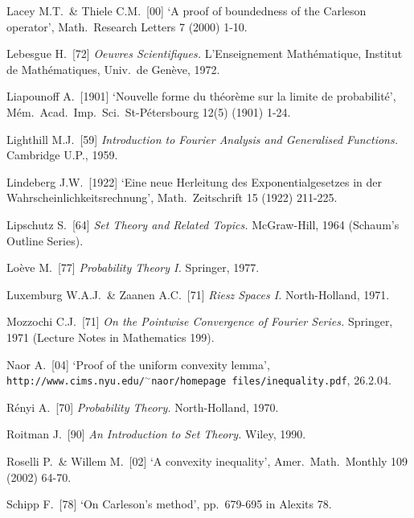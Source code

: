 {Lacey M.T.\ \& Thiele C.M.\ [00] `A proof of boundedness of the Carleson
operator', Math.\ Research Letters 7 (2000) 1-10.
\cmmnt{[\S286 {\it pendahuluan}, 286H.]}

Lebesgue H.\ [72] {\it Oeuvres Scientifiques.}   L'Enseignement
Math\'ematique, Institut de Math\'ematiques, Univ.\ de Gen\`eve, 1972.

Liapounoff A.\ [1901] `Nouvelle forme du th\'eor\`eme sur la limite
de probabilit\'e', M\'em.\ Acad.\ Imp.\ Sci.\ St-P\'etersbourg 12(5)
(1901) 1-24. \cmmnt{[274Xh.]}

Lighthill M.J.\ [59] {\it Introduction to Fourier Analysis and
Generalised Functions.}  Cambridge U.P., 1959.
\cmmnt{[\S284 {\it catatan}.]}

Lindeberg J.W.\ [1922] `Eine neue Herleitung des Exponentialgesetzes in
der Wahrscheinlichkeitsrechnung', Math.\ Zeitschrift 15 (1922) 211-225.
\cmmnt{[274H, \S274 {\it catatan}.]}

Lipschutz S.\ [64] {\it Set Theory and Related Topics.}  McGraw-Hill,
1964 (Schaum's Outline Series).  \cmmnt{[\S2A1.]}

Lo\`eve M.\ [77] {\it Probability Theory I.} Springer, 1977.

Luxemburg W.A.J.\ \& Zaanen A.C.\ [71] {\it Riesz Spaces
I.} North-Holland, 1971.
\cmmnt{[241F.]}


\medskip%

Mozzochi C.J.\ [71] {\it On the Pointwise Convergence of Fourier
Series.}   Springer, 1971 (Lecture Notes in Mathematics 199).
\cmmnt{[\S286 {\it catatan}.]}

\medskip%

Naor A.\ [04] `Proof of the uniform convexity lemma',
{\tt http://www.cims.nyu.edu/$^{\sim}$naor/homepage files/\ifnum{}\break\fi{\vthsp}inequality\discretionary{}{}{}.pdf},
26.2.04.
\cmmnt{[244O.]}

\medskip%

R\'enyi A.\ [70] {\it Probability Theory.}  North-Holland, 1970.
\cmmnt{[274H.]}

Roitman J.\ [90] {\it  An Introduction to Set Theory.}  Wiley, 1990.
\cmmnt{[\S2A1.]}

Roselli P.\ \& Willem M.\ [02] `A convexity inequality',
Amer.\ Math.\ Monthly 109 (2002) 64-70.
\cmmnt{[244Ym.]}

\medskip%

Schipp F.\ [78] `On Carleson's method', pp.\ 679-695 in
{\smc Alexits 78}.   \cmmnt{[\S286 {\it catatan}.]}

}
